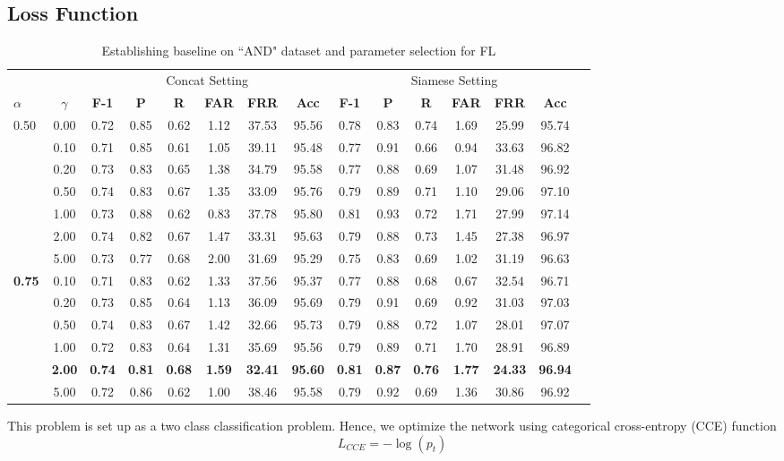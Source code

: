\documentclass[a4paper,conference]{IEEEtran}
\begin{document}
\subsection{Loss Function}
\begin{table*}[!htp]\centering
\caption{Establishing baseline on ``AND" dataset and parameter selection for FL}\label{tab:baseline_and}
\scriptsize
\begin{tabular}{lc|cccccc|ccccccc}\toprule
& &\multicolumn{6}{c|}{Concat Setting} &\multicolumn{6}{c}{Siamese Setting} \\\cmidrule{3-14}
\textbf{$\alpha$} &\textbf{$\gamma$} &\textbf{F-1} &\textbf{P} &\textbf{R} &\textbf{FAR} &\textbf{FRR} &\textbf{Acc} &\textbf{F-1} &\textbf{P} &\textbf{R} &\textbf{FAR} &\textbf{FRR} &\textbf{Acc } \\\midrule
\multirow{7}{*}{0.50} &0.00 &0.72 &0.85 &0.62 &1.12 &37.53 &95.56 &0.78 &0.83 &0.74 &1.69 &25.99 &95.74 \\
&0.10 &0.71 &0.85 &0.61 &1.05 &39.11 &95.48 &0.77 &0.91 &0.66 &0.94 &33.63 &96.82 \\
&0.20 &0.73 &0.83 &0.65 &1.38 &34.79 &95.58 &0.77 &0.88 &0.69 &1.07 &31.48 &96.92 \\
&0.50 &0.74 &0.83 &0.67 &1.35 &33.09 &95.76 &0.79 &0.89 &0.71 &1.10 &29.06 &97.10 \\
&1.00 &0.73 &0.88 &0.62 &0.83 &37.78 &95.80 &0.81 &0.93 &0.72 &1.71 &27.99 &97.14 \\
&2.00 &0.74 &0.82 &0.67 &1.47 &33.31 &95.63 &0.79 &0.88 &0.73 &1.45 &27.38 &96.97 \\
&5.00 &0.73 &0.77 &0.68 &2.00 &31.69 &95.29 &0.75 &0.83 &0.69 &1.02 &31.19 &96.63 \\
\midrule
\multirow{6}{*}{\textbf{0.75}} &0.10 &0.71 &0.83 &0.62 &1.33 &37.56 &95.37 &0.77 &0.88 &0.68 &0.67 &32.54 &96.71 \\
&0.20 &0.73 &0.85 &0.64 &1.13 &36.09 &95.69 &0.79 &0.91 &0.69 &0.92 &31.03 &97.03 \\
&0.50 &0.74 &0.83 &0.67 &1.42 &32.66 &95.73 &0.79 &0.88 &0.72 &1.07 &28.01 &97.07 \\
&1.00 &0.72 &0.83 &0.64 &1.31 &35.69 &95.56 &0.79 &0.89 &0.71 &1.70 &28.91 &96.89 \\
&\textbf{2.00} &\textbf{0.74} &\textbf{0.81} &\textbf{0.68} &\textbf{1.59} &\textbf{32.41} &\textbf{95.60} &\textbf{0.81} &\textbf{0.87} &\textbf{0.76} &\textbf{1.77} &\textbf{24.33} &\textbf{96.94} \\
&5.00 &0.72 &0.86 &0.62 &1.00 &38.46 &95.58 &0.79 &0.92 &0.69 &1.36 &30.86 &96.92 \\
\bottomrule
\end{tabular}
\end{table*}
This problem is set up as a two class classification problem. Hence, we optimize the network using categorical cross-entropy (CCE) function 
\begin{equation}
  \label{eq:multipleentropy}
    L_{CCE} =  - \log(p_t)
\end{equation}
\end{document}
